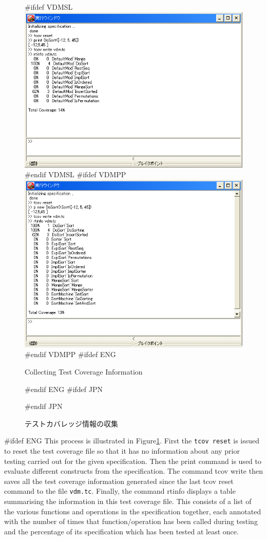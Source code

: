 \documentclass[\pformat,12pt]{article}
\newcommand{\guicmd}[1]{{\sf #1}}
\newcommand{\guicmd}[1]{{\gt #1}}
\begin{document}
\begin{figure}[tbh]
\begin{center}
#ifdef VDMSL
\includegraphics[width=12.5cm]{testCov-sl.png}
#endif VDMSL
#ifdef VDMPP
\includegraphics[width=12.5cm]{testCov-pp.png}
#endif VDMPP
#ifdef ENG
\caption{Collecting Test Coverage Information}
#endif ENG
#ifdef JPN
\caption{テストカバレッジ情報の収集}
#endif JPN
\label{fig:guitcov}
\end{center}
\end{figure}

#ifdef ENG
This process is illustrated in Figure\ref{fig:guitcov}. First the 
{\tt tcov reset} is issued to
reset the test coverage file so that it has no information about any
prior testing carried out for the given specification. Then the
\guicmd{print} command is used to evaluate different constructs from
the specification. The command \guicmd{tcov write} then saves all the test coverage information
generated since the last \guicmd{tcov reset} command to the file
\texttt{vdm.tc}. Finally, the command \guicmd{rtinfo} 
displays a table summarising the information in
this test coverage 
file. This consists of a list of the various functions and operations
in the specification together, each annotated with the number of times
that function/operation has been called during testing and the
percentage of its specification which has been tested at least once.
\end{document}

